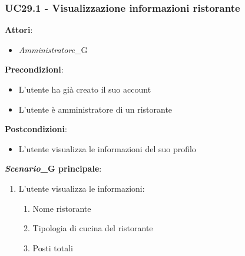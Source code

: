 \subsubsection{UC29.1 - Visualizzazione informazioni ristorante}\label{usecase:29_1}
\textbf{Attori}:
\begin{itemize}
    \item \textit{Amministratore}_G
\end{itemize}
\textbf{Precondizioni}:
\begin{itemize}
    \item L'utente ha già creato il suo account
    \item L'utente è amministratore di un ristorante
\end{itemize}
\textbf{Postcondizioni}:
\begin{itemize}
    \item L'utente visualizza le informazioni del suo profilo
\end{itemize}
\textbf{\textit{Scenario}_G principale}:
\begin{enumerate}
    \item L'utente visualizza le informazioni:
    \begin{enumerate}
        \item Nome ristorante
        \item Tipologia di cucina del ristorante
        \item Posti totali
    \end{enumerate}
\end{enumerate}